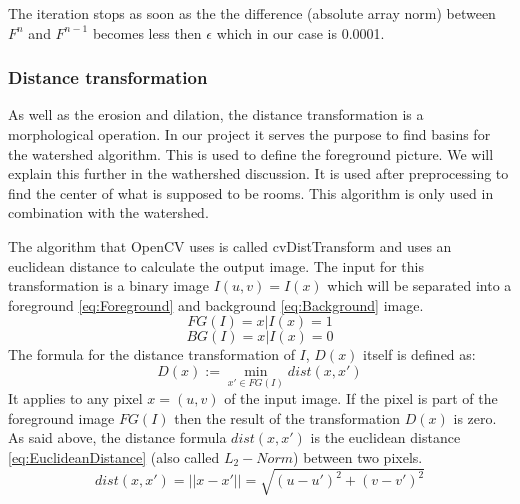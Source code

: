 The iteration stops as soon as the the difference (absolute array norm) between $F^{n}$ and $F^{n-1}$ becomes less then $\epsilon$ which in our case is 0.0001.

\subsubsection{Distance transformation}
\label{subsubsec:Distance transformation}
As well as the erosion and dilation, the distance transformation is a morphological operation. In our project it serves the purpose to find basins for the watershed algorithm. This is used to define the foreground picture. We will explain this further in the wathershed discussion.
It is used after preprocessing to find the center of what is supposed to be rooms. This algorithm is only used in combination with the watershed.

The algorithm that OpenCV uses is called cvDistTransform and uses an euclidean distance to calculate the output image. The input for this transformation is a binary image $I(u,v) = I(x)$ which will be separated into a foreground \eqref{eq:Foreground} and background \eqref{eq:Background} image.
\begin{equation}\label{eq:Foreground}FG(I) = {x | I(x) = 1}\end{equation}
\begin{equation}\label{eq:Background}BG(I) = {x | I(x) = 0}\end{equation}
The formula for the distance transformation of $I$, $D(x)$ itself is defined as:
\[D(x) :=\min_{x' \in FG(I)} dist(x,x') \]
It applies to any pixel $x = (u,v)$ of the input image. If the pixel is part of the foreground image $FG(I)$ then the result of the transformation $D(x)$ is zero. As said above, the distance formula $dist(x,x')$ is the euclidean distance \eqref{eq:EuclideanDistance} (also called $L_{2}-Norm$) between two pixels.
\begin{equation}\label{eq:EuclideanDistance}dist(x,x') = ||x - x'|| = \sqrt{(u - u')^2 + (v - v')^2}\end{equation}

